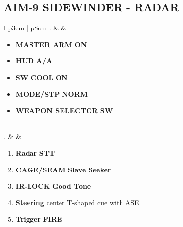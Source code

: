 \documentclass[8pt,usenames,dvipsnames,twoside]{article}
\begin{document}
		\subsection{AIM-9 SIDEWINDER - RADAR}
		\begin{center}
			\begin{tabular}{l p{3cm} | p{8cm}}
				. &  & 
				\begin{minipage}[t]{\linewidth}
					\vspace{-7pt}
					\begin{itemize}
						\item \textbf{MASTER ARM} \dotfill \textbf{ON}
						\item \textbf{HUD} \dotfill \textbf{A/A}
						\item \textbf{SW COOL} \dotfill \textbf{ON}
						\item \textbf{MODE/STP} \dotfill \textbf{NORM}
						\item \textbf{WEAPON SELECTOR} \dotfill \textbf{SW}
					\end{itemize} 
				\end{minipage} \\
				. &  & 
				\begin{minipage}[t]{\linewidth}
					\vspace{-7pt}
					\begin{enumerate}[label=(\alph*)]
						\item \textbf{Radar} \dotfill \textbf{STT}
						\item \textbf{CAGE/SEAM} \dotfill \textbf{Slave Seeker}
						\item \textbf{IR-LOCK} \dotfill \textbf{Good Tone}
						\item \textbf{Steering} \dotfill center T-shaped cue with ASE
						\item \textbf{Trigger} \dotfill \textbf{FIRE}
					\end{enumerate}
				\end{minipage} \\
				\bottomrule
			\end{tabular}
		\end{center}
	
		\clearpage
	
\end{document}
